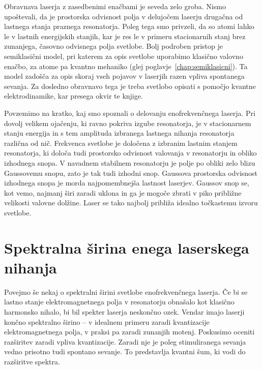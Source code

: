 \begin{remark}
Obravnava laserja z zasedbenimi enačbami je seveda zelo groba. Nismo
upoštevali, da je prostorska odvisnost polja v delujočem laserju 
drugačna od lastnega stanja praznega resonatorja. Poleg tega smo
privzeli, da so atomi lahko le v lastnih energijskih stanjih, kar je res le
v primeru stacionarnih stanj brez zunanjega, časovno odvisnega polja
svetlobe. Bolj podroben pristop je semiklasični model, pri katerem 
za opis svetlobe uporabimo klasično valovno enačbo, za atome
pa kvantno mehaniko (glej poglavje~\ref{chap:semiklasicni}). Ta model
zadošča za opis skoraj vseh pojavov v laserjih razen vpliva spontanega sevanja. 
Za dosledno obravnavo tega je treba svetlobo opisati s pomočjo 
kvantne elektrodinamike, kar presega okvir te knjige.
\end{remark}

Povzemimo na kratko, kaj smo spoznali o delovanju 
enofrekvenčnega laserja. Pri dovolj velikem ojačenju, ki ravno pokriva izgube 
resonatorja, je v stacionarnem stanju energija in s tem amplituda 
izbranega lastnega nihanja resonatorja različna od nič. Frekvenca svetlobe je
določena z izbranim lastnim stanjem resonatorja, ki določa tudi prostorsko
odvisnost valovanja v resonatorju in obliko izhodnega snopa. V navadnem stabilnem 
resonatorju je polje po obliki zelo blizu Gaussovemu snopu, zato je tak tudi izhodni snop.
Gaussova prostorska odvisnost izhodnega snopa je morda najpomembnejša lastnost
laserjev. Gaussov snop se, kot vemo, najmanj širi zaradi uklona in ga je mogoče
zbrati v piko približne velikosti valovne dolžine. Laser se tako najbolj 
približa idealno točkastemu izvoru svetlobe.

\section{Spektralna širina enega laserskega nihanja}
Povejmo še nekaj o spektralni širini svetlobe enofrekvenčnega laserja. 
Če bi se lastno stanje 
elektromagnetnega polja v resonatorju obnašalo kot klasično 
harmonsko nihalo, bi bil spekter laserja neskončno ozek. Vendar 
imajo laserji končno spektralno širino -- v idealnem primeru zaradi
kvantizacije elektromagnetnega polja, v praksi pa zaradi zunanjih motenj.
Poskusimo oceniti razširitev zaradi vpliva kvantizacije. Zaradi nje
je poleg stimuliranega sevanja vedno prisotno tudi spontano sevanje. To 
predstavlja kvantni šum, ki vodi do razširitve spektra. 


